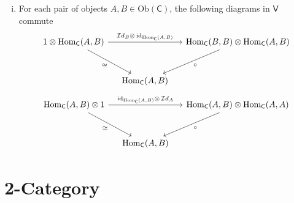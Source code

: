 {\begin{enumerate}[(i)]
\[\begin{tikzcd}[ampersand replacement=\&, column sep=small]
\end{tikzcd}
    \]
    \item For each pair of objects $A,B\in \mathrm{Ob}(\mathsf{C})$, the following diagrams in $\mathsf{V}$ commute
    \[
    \begin{tikzcd}[ampersand replacement=\&, column sep=small]
        {1\otimes \mathrm{Hom}_{\mathsf{C}}(A,B)} \arrow[rr, "{{\mathcal{I}d}_B\otimes\,\mathrm{id}_{\mathrm{Hom}_{\mathsf{C}}(A,B)}}"] \arrow[rd, "\cong"'] \&                     \& {\mathrm{Hom}_{\mathsf{C}}(B,B)\otimes \mathrm{Hom}_{\mathsf{C}}(A,B)} \arrow[ld, "\circ"] \\[+10pt]
        \& {\mathrm{Hom}_{\mathsf{C}}(A,B)} \&   
\end{tikzcd}
    \]
    \[
        \begin{tikzcd}[ampersand replacement=\&, column sep=small]
            {\mathrm{Hom}_{\mathsf{C}}(A,B)\otimes 1} \arrow[rr, "\mathrm{id}_{\mathrm{Hom}_{\mathsf{C}}(A,B)}\otimes\,{\mathcal{I}d}_A "] \arrow[rd, "\cong"'] \&                     \& {\mathrm{Hom}_{\mathsf{C}}(A,B)\otimes \mathrm{Hom}_{\mathsf{C}}(A,A)} \arrow[ld, "\circ"] \\[+10pt]
            \& {\mathrm{Hom}_{\mathsf{C}}(A,B)} \&
    \end{tikzcd}
        \]
    \end{enumerate}
}

\section{2-Category}

